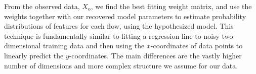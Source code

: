 \documentclass[conference]{IEEEtran}
\begin{document}
From the observed data, $X_\text{o}$, we find the best fitting weight matrix, and use the weights together with our recovered model parameters to estimate probability distributions of features for each flow, using the hypothesized model.
This technique is fundamentally similar to fitting a regression line to noisy two-dimensional training data and then using the $x$-coordinates of data points to linearly predict the $y$-coordinates.
The main differences are the vastly higher number of dimensions and more complex structure we assume for our data.


\end{document}
